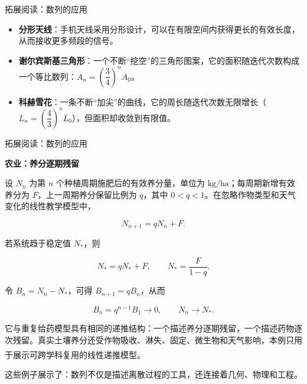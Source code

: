 \documentclass[aspectratio=169,10pt,fontset=fandol]{ctexbeamer}
\newcommand{\upcite}[1]{\textsuperscript{\textsuperscript{\cite{#1}}}}
\begin{document}
\begin{frame}[t,fragile]{拓展阅读：数列的应用}
\normalsize
{\normalsize
\begin{itemize}

\item \textbf{分形天线}：手机天线采用分形设计，可以在有限空间内获得更长的有效长度，从而接收更多频段的信号。

\item \textbf{谢尔宾斯基三角形}：一个不断“挖空”的三角形图案，它的面积随迭代次数构成一个等比数列：\(A_n = \left(\dfrac{3}{4}\right)^n A_0\)。

\item \textbf{科赫雪花}：一条不断“加尖”的曲线，它的周长随迭代次数无限增长（\(L_n = \left(\dfrac{4}{3}\right)^n L_0\)），但面积却收敛到有限值。

\end{itemize}
}
\end{frame}
\begin{frame}[t,fragile]{拓展阅读：数列的应用}
\normalsize
{\normalsize










\textbf{农业：养分逐期残留}

设 $N_n$ 为第 $n$ 个种植周期施肥后的有效养分量，单位为 $\mathrm{kg/ha}$；每周期新增有效养分为 $F$，上一周期养分保留比例为 $q$，其中 $0<q<1$。在忽略作物类型和天气变化的线性教学模型中，

\[

N_{n+1}=qN_n+F.

\]

若系统趋于稳定值 $N_*$，则

\[

N_*=qN_*+F,\qquad N_*=\frac{F}{1-q}.

\]

令 $B_n=N_n-N_*$，可得 $B_{n+1}=qB_n$，从而

\[

B_n=q^{n-1}B_1\to0,\qquad N_n\to N_*.

\]

它与重复给药模型具有相同的递推结构：一个描述养分逐期残留，一个描述药物逐次残留。真实土壤养分还受作物吸收、淋失、固定、微生物和天气影响，本例只用于展示可跨学科复用的线性递推模型。\upcite{BradyWeil}



这些例子展示了：数列不仅是描述离散过程的工具，还连接着几何、物理和工程。


}
\end{frame}
\end{document}
